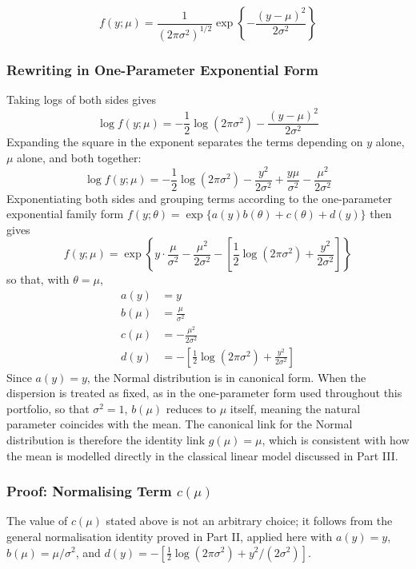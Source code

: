 \documentclass[12pt,a4paper]{report}
\begin{document}
\[
f(y;\mu) = \frac{1}{(2\pi\sigma^2)^{1/2}}\exp\left\{-\frac{(y-\mu)^2}{2\sigma^2}\right\}
\]

\subsubsection*{Rewriting in One-Parameter Exponential Form}

Taking logs of both sides gives
\[
\log f(y;\mu) = -\frac{1}{2}\log(2\pi\sigma^2) - \frac{(y-\mu)^2}{2\sigma^2}
\]
Expanding the square in the exponent separates the terms depending on $y$ alone, $\mu$ alone, and both together:
\[
\log f(y;\mu) = -\frac{1}{2}\log(2\pi\sigma^2) - \frac{y^2}{2\sigma^2} + \frac{y\mu}{\sigma^2} - \frac{\mu^2}{2\sigma^2}
\]
Exponentiating both sides and grouping terms according to the one-parameter exponential family form $f(y;\theta) = \exp\{a(y)b(\theta) + c(\theta) + d(y)\}$ then gives
\[
f(y;\mu) = \exp\left\{y\cdot\frac{\mu}{\sigma^2} - \frac{\mu^2}{2\sigma^2} - \left[\frac{1}{2}\log(2\pi\sigma^2) + \frac{y^2}{2\sigma^2}\right]\right\}
\]
so that, with $\theta = \mu$,
\begin{align*}
a(y) &= y \\[4pt]
b(\mu) &= \frac{\mu}{\sigma^2} \\[4pt]
c(\mu) &= -\frac{\mu^2}{2\sigma^2} \\[4pt]
d(y) &= -\left[\frac{1}{2}\log(2\pi\sigma^2) + \frac{y^2}{2\sigma^2}\right]
\end{align*}
Since $a(y) = y$, the Normal distribution is in canonical form. When the dispersion is treated as fixed, as in the one-parameter form used throughout this portfolio, so that $\sigma^2 = 1$, $b(\mu)$ reduces to $\mu$ itself, meaning the natural parameter coincides with the mean. The canonical link for the Normal distribution is therefore the identity link $g(\mu) = \mu$, which is consistent with how the mean is modelled directly in the classical linear model discussed in Part III.

\subsubsection*{Proof: Normalising Term $c(\mu)$}

The value of $c(\mu)$ stated above is not an arbitrary choice; it follows from the general normalisation identity proved in Part II, applied here with $a(y) = y$, $b(\mu) = \mu/\sigma^2$, and $d(y) = -\left[\tfrac{1}{2}\log(2\pi\sigma^2) + y^2/(2\sigma^2)\right]$.
\end{document}
